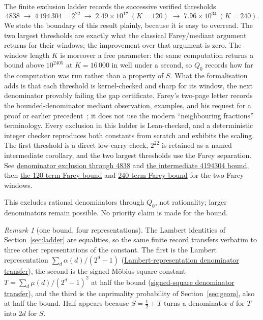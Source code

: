 \documentclass[11pt]{article}
\newcommand{\commit}{99f4bf47422abbd8757cbb22b50ba079d764d3a7}
\newcommand{\repobase}{https://github.com/wcook04/plectis-erdos/blob/\commit}
\newcommand{\PK}{Erdos249257}
\newcommand{\lword}[4]{\href{\repobase/\PK/#1\#L#2}{#4}}
\theoremstyle{definition}
\theoremstyle{remark}
\newtheorem*{remark}{Remark}
\newcommand{\Qzero}{Q_0}
\begin{document}
The finite exclusion ladder records the successive verified thresholds
\[
4838 \;\to\; 4\,194\,304 = 2^{22} \;\to\; 2.49\times10^{17}\ (K{=}120)
\;\to\; 7.96\times10^{34}\ (K{=}240).
\]
We state the boundary of this result plainly, because it is easy to overread.
The two largest thresholds are exactly what the classical Farey/mediant
argument returns for their windows; the improvement over that argument is
zero.  The window length \(K\) is moreover a free parameter: the same
computation returns a bound above \(10^{2405}\) at \(K=16\,000\) in well under
a second, so \(\Qzero\) records how far the computation was run rather than a
property of \(S\).  What the formalisation adds is that each threshold is
kernel-checked and sharp for its window, the next denominator provably failing
the gap certificate.  Farey's two-page letter records the bounded-denominator
mediant observation, examples, and his request for a proof or earlier
precedent~\cite[pp.~385--386]{farey1816}; it does not use the modern
``neighbouring fractions'' terminology.  Every exclusion in this ladder is
Lean-checked, and a deterministic integer checker reproduces both constants
from scratch and exhibits the scaling.  The first threshold is a direct
low-carry check,
$2^{22}$ is retained as a named intermediate corollary, and the two largest
thresholds use the Farey separation. See
\lword{CertificateKernel.lean}{15675}{tsum_totient_div_pow_two_ne_ratCast_of_den_le_4838}{denominator exclusion through 4838}
and \lword{CertificateKernel.lean}{18357}{tsum_totient_div_pow_two_ne_ratCast_of_den_le_4194304}{the intermediate 4194304 bound},
then \lword{GapFareyBound.lean}{88}{gap_check_window_1_120_le_248672326362367909}{the 120-term Farey bound} and
\lword{GapFareyBound.lean}{176}{gap_check_window_1_240_le_79639646646701375323355774875831053}{240-term Farey bound}
for the two Farey windows.

This excludes rational denominators through $\Qzero$, not rationality;
larger denominators remain possible.  No priority claim is made for the bound.

\begin{remark}[one bound, four representations]
The Lambert identities of Section~\ref{sec:ladder} are equalities, so the same
finite record transfers verbatim to three other representations of the constant.
The first is the Lambert representation $\sum_d \alpha(d)/(2^d-1)$
(\lword{CertificateKernel.lean}{18473}{tsum_primWeight_div_two_pow_sub_one_ne_int_div_of_den_le_79639646646701375323355774875831053}{Lambert-representation denominator transfer}),
the second is the signed M\"obius-square constant $T=\sum_d\mu(d)/(2^d-1)^2$ at half the bound
(\lword{CertificateKernel.lean}{18487}{tsum_moebius_div_two_pow_sub_one_sq_ne_int_div_of_den_le_39819823323350687661677887437915526}{signed-square denominator transfer}),
and the third is the coprimality probability of Section~\ref{sec:geom}, also at half the bound.
Half appears because $S=\tfrac12+T$ turns a denominator $d$ for $T$ into $2d$ for $S$.
\end{remark}
\end{document}
